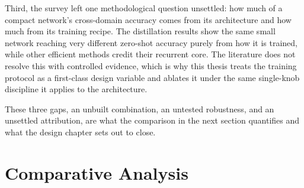 Third, the survey left one methodological question unsettled: how much of
a compact network's cross-domain accuracy comes from its architecture and
how much from its training recipe. The distillation results show the same
small network reaching very different zero-shot accuracy purely from how
it is trained, while other efficient methods credit their recurrent core.
The literature does not resolve this with controlled evidence, which is
why this thesis treats the training protocol as a first-class design
variable and ablates it under the same single-knob discipline it applies
to the architecture.

These three gaps, an unbuilt combination, an untested robustness, and an
unsettled attribution, are what the comparison in the next section
quantifies and what the design chapter sets out to close.

\FloatBarrier
\section{Comparative Analysis}
\label{sec:comparative_analysis}

